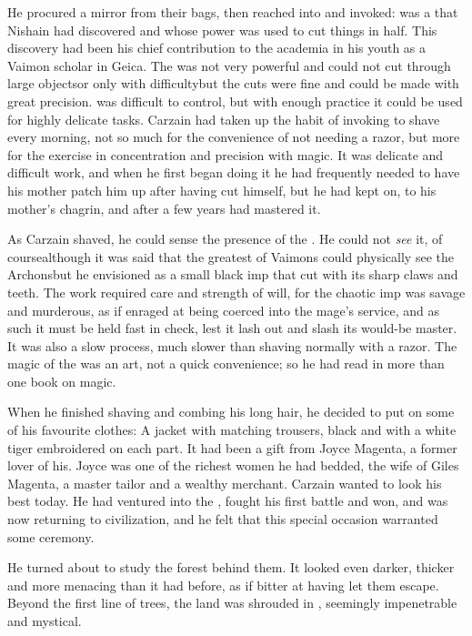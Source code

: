 He procured a mirror from their bags, then reached into  and invoked: 
\Gavron{} was a   that Nishain had discovered and whose power was used to cut things in half. This discovery had been his chief contribution to the academia in his youth as a Vaimon scholar in Geica. The \Kliffah{} was not very powerful and could not cut through large objects\dash{}or only with difficulty\dash{}but the cuts were fine and could be made with great precision. \Gavron{} was difficult to control, but with enough practice it could be used for highly delicate tasks. Carzain had taken up the habit of invoking \Gavron{} to shave every morning, not so much for the convenience of not needing a razor, but more for the exercise in concentration and precision with magic. It was delicate and difficult work, and when he first began doing it he had frequently needed to have his mother patch him up after having cut himself, but he had kept on, to his mother's chagrin, and after a few years had mastered it. 

As Carzain shaved, he could sense the presence of the \Kliffah{}. He could not \emph{see} it, of course\dash{}although it was said that the greatest of Vaimons could physically see the Archons\dash{}but he envisioned \Gavron{} as a small black imp that cut with its sharp claws and teeth. The work required care and strength of will, for the chaotic imp was savage and murderous, as if enraged at being coerced into the mage's service, and as such it must be held fast in check, lest it lash out and slash its would-be master. It was also a slow process, much slower than shaving normally with a razor. The magic of the \Archons{} was an art, not a quick convenience; so he had read in more than one book on magic. 

When he finished shaving and combing his long hair, he decided to put on some of his favourite clothes: A jacket with matching trousers, black and with a white tiger embroidered on each part. It had been a gift from Joyce Magenta, a former lover of his. Joyce was one of the richest women he had bedded, the wife of Giles Magenta, a master tailor and a wealthy merchant. Carzain wanted to look his best today. 
He had ventured into the \Wylde{}, fought his first battle and won, and was now returning to civilization, and he felt that this special occasion warranted some ceremony.

He turned about to study the forest behind them. It looked even darker, thicker and more menacing than it had before, as if bitter at having let them escape. Beyond the first line of trees, the land was shrouded in \wildfog{}, seemingly impenetrable and mystical.

